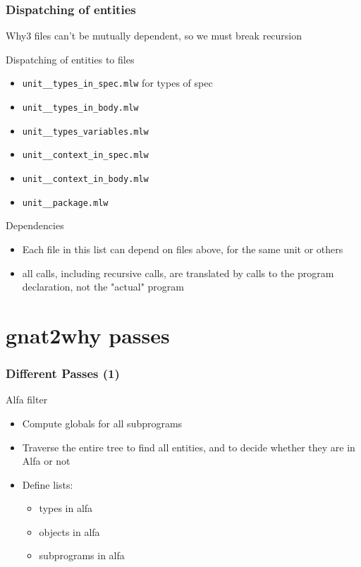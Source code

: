 \documentclass{beamer}
\newenvironment{specialframe}{%
  \begin{frame}[fragile,environment=specialframe]}{\end{frame}}
\begin{document}
\begin{specialframe}\frametitle{Dispatching of entities}

Why3 files can't be mutually dependent, so we must break recursion
\vspace{-1em}

   \begin{block}{Dispatching of entities to files}
      \begin{itemize}
         \item \verb|unit__types_in_spec.mlw| for types of spec
         \item \verb|unit__types_in_body.mlw|
         \item \verb|unit__types_variables.mlw|
         \item \verb|unit__context_in_spec.mlw|
         \item \verb|unit__context_in_body.mlw|
         \item \verb|unit__package.mlw|
      \end{itemize}
   \end{block}
   \begin{block}{Dependencies}
      \begin{itemize}
         \item Each file in this list can depend on files above, for the same unit or others
         \item all calls, including recursive calls, are translated by calls to
the program declaration, not the "actual" program
      \end{itemize}
   \end{block}
\end{specialframe}

\section{gnat2why passes}

\begin{specialframe}\frametitle{Different Passes (1)}

   \begin{block}{Alfa filter}
      \begin{itemize}
         \item Compute globals for all subprograms
         \item Traverse the entire tree to find all entities, and to decide
            whether they are in Alfa or not
         \item Define lists:
            \begin{itemize}
                  \item types in alfa
                  \item objects in alfa
                  \item subprograms in alfa
            \end{itemize}
      \end{itemize}
   \end{block}
\end{specialframe}
\end{document}
